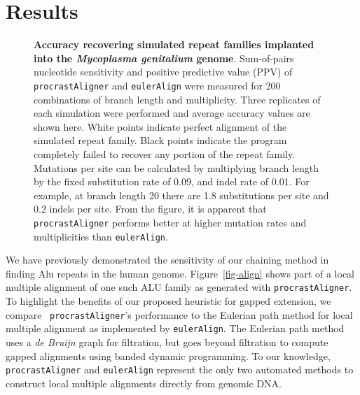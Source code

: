 \documentclass{llncs}
\begin{document}
\section{Results}
\begin{figure}[t]
\centering {}
\caption{\textbf{Accuracy recovering simulated repeat families implanted into the
\textit{Mycoplasma genitalium} genome}.  Sum-of-pairs nucleotide
sensitivity and positive predictive value (PPV) of \texttt{procrastAligner} and \texttt{eulerAlign} were measured for 200
combinations of branch length and multiplicity.  Three replicates of
each simulation were performed and average accuracy values are shown
here.  White points indicate perfect alignment of the simulated repeat
family.  Black points indicate the program completely failed to
recover any portion of the repeat family.  Mutations per site can be
calculated by multiplying branch length by the fixed substitution rate
of 0.09, and indel rate of 0.01.  For example, at branch length 20
there are 1.8 substitutions per site and 0.2 indels per site.  From
the figure, it is apparent that \texttt{procrastAligner} performs better
at higher mutation rates and multiplicities than \texttt{eulerAlign}.}
\label{fig-results}\vspace{-0.2cm}
\end{figure}

We have previously demonstrated the sensitivity of our chaining method
in finding Alu repeats in the human
genome\cite{ref-procrast}. Figure~\ref{fig-align} shows part of a
local multiple alignment of one such ALU family as generated with
\texttt{procrastAligner}. To highlight the benefits of our proposed
heuristic for gapped extension, we compare ~\texttt{procrastAligner}'s
performance to the Eulerian path method for local multiple alignment
as implemented by \texttt{eulerAlign}\cite{ref-related1}. The Eulerian
path method uses a \textit{de Bruijn} graph for filtration, but goes
beyond filtration to compute gapped alignments using banded dynamic
programming.  To our knowledge, \texttt{procrastAligner} and
\texttt{eulerAlign} represent the only two automated methods to
construct local multiple alignments directly from genomic DNA.
\end{document}

